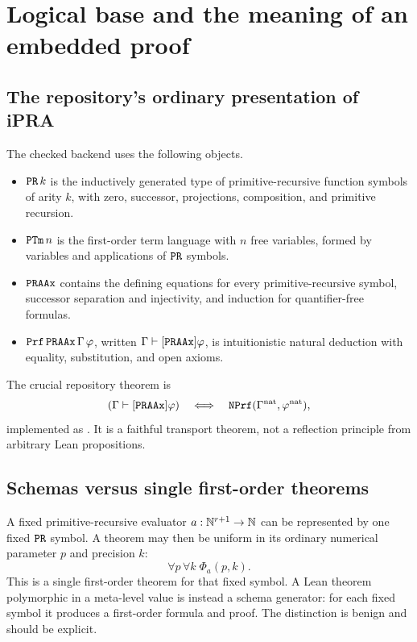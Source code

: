 \section{Logical base and the meaning of an embedded proof}

\subsection{The repository's ordinary presentation of iPRA}

The checked backend uses the following objects.

\begin{itemize}
\item \(\texttt{PR}\,k\) is the inductively generated type of primitive-recursive
      function symbols of arity \(k\), with zero, successor, projections,
      composition, and primitive recursion.
\item \(\texttt{PTm}\,n\) is the first-order term language with \(n\) free variables,
      formed by variables and applications of \(\texttt{PR}\) symbols.
\item \(\texttt{PRAAx}\) contains the defining equations for every primitive-recursive
      symbol, successor separation and injectivity, and induction for
      quantifier-free formulas.
\item \(\texttt{Prf}\,\texttt{PRAAx}\,\Gamma\,\varphi\), written
      \(\Gamma\vdash[\texttt{PRAAx}]\varphi\), is intuitionistic natural deduction
      with equality, substitution, and open axioms.
\end{itemize}

The crucial repository theorem is
\[
(\Gamma\vdash[\texttt{PRAAx}]\varphi)
\quad\Longleftrightarrow\quad
\texttt{NPrf}(\Gamma^{\mathrm{nat}},\varphi^{\mathrm{nat}}),
\]
implemented as .  It is a faithful transport theorem,
not a reflection principle from arbitrary Lean propositions.

\subsection{Schemas versus single first-order theorems}

A fixed primitive-recursive evaluator \(a:\mathbb N^{r+1}\to\mathbb N\) can be represented
by one fixed \(\texttt{PR}\) symbol.  A theorem may then be uniform in its ordinary
numerical parameter \(p\) and precision \(k\):
\[
  \forall p\,\forall k\;\Phi_a(p,k).
\]
This is a single first-order theorem for that fixed symbol.  A Lean theorem
polymorphic in a meta-level value  is instead a schema
generator: for each fixed symbol it produces a first-order formula and proof.
The distinction is benign and should be explicit.

